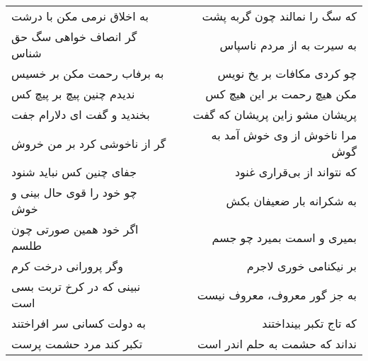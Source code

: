 \begin{center}
\begin{longtable}{l p{0.5cm} r}
به اخلاق نرمی مکن با درشت
&&
که سگ را نمالند چون گربه پشت
\\
گر انصاف خواهی سگ حق شناس
&&
به سیرت به از مردم ناسپاس
\\
به برفاب رحمت مکن بر خسیس
&&
چو کردی مکافات بر یخ نویس
\\
ندیدم چنین پیچ بر پیچ کس
&&
مکن هیچ رحمت بر این هیچ کس
\\
بخندید و گفت ای دلارام جفت
&&
پریشان مشو زاین پریشان که گفت
\\
گر از ناخوشی کرد بر من خروش
&&
مرا ناخوش از وی خوش آمد به گوش
\\
جفای چنین کس نباید شنود
&&
که نتواند از بی‌قراری غنود
\\
چو خود را قوی حال بینی و خوش
&&
به شکرانه بار ضعیفان بکش
\\
اگر خود همین صورتی چون طلسم
&&
بمیری و اسمت بمیرد چو جسم
\\
وگر پرورانی درخت کرم
&&
بر نیکنامی خوری لاجرم
\\
نبینی که در کرخ تربت بسی است
&&
به جز گور معروف، معروف نیست
\\
به دولت کسانی سر افراختند
&&
که تاج تکبر بینداختند
\\
تکبر کند مرد حشمت پرست
&&
نداند که حشمت به حلم اندر است
\\
\end{longtable}
\end{center}
